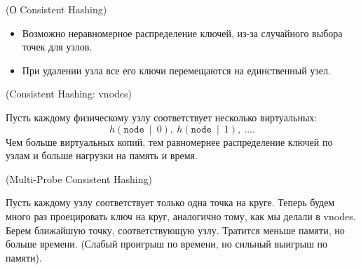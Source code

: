 \begin{remark}(О Consistent Hashing)
    \enewline
    \begin{itemize}
        \item Возможно неравномерное распределение ключей, из-за случайного выбора
            точек для узлов.
        \item При удалении узла все его ключи перемещаются на единственный узел.
    \end{itemize}
\end{remark}

\begin{algorithm}(Consistent Hashing: vnodes)
    
    Пусть каждому физическому узлу соответствует несколько виртуальных:
    \[
        h(\texttt{node} ~\mid~ 0),~ h(\texttt{node} ~\mid~ 1),~ \ldots
    .\]
    Чем больше виртуальных копий, тем равномернее распределение ключей по узлам
    и больше нагрузки на память и время.
\end{algorithm}

\begin{algorithm}(Multi-Probe Consistent Hashing)
    
    Пусть каждому узлу соответствует только одна точка на круге. Теперь будем
    много раз проецировать ключ на круг, аналогично тому, как мы делали в vnodes.
    Берем ближайшую точку, соответствующую узлу. Тратится меньше памяти, но больше
    времени. (Слабый проигрыш по времени, но сильный выигрыш по памяти).
\end{algorithm}

